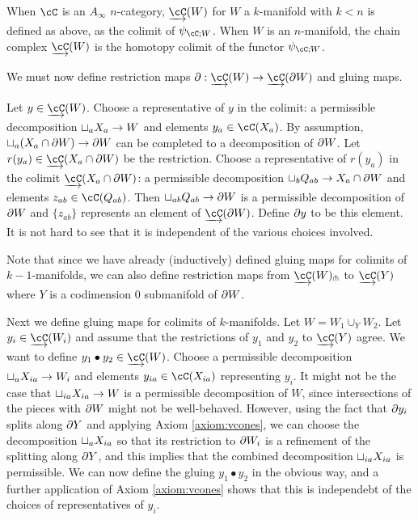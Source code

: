 \begin{defn}
When $\cC$ is an $A_\infty$ $n$-category, $\cl{\cC}(W)$ for $W$ a $k$-manifold with $k < n$ 
is defined as above, as the colimit of $\psi_{\cC;W}$.
When $W$ is an $n$-manifold, the chain complex $\cl{\cC}(W)$ is the homotopy colimit of the functor $\psi_{\cC;W}$.
\end{defn}


\medskip

We must now define restriction maps $\bd : \cl{\cC}(W) \to \cl{\cC}(\bd W)$ and gluing maps.

Let $y\in \cl{\cC}(W)$.
Choose a representative of $y$ in the colimit: a permissible decomposition $\sqcup_a X_a \to W$ and elements
$y_a \in \cC(X_a)$.
By assumption, $\sqcup_a (X_a \cap \partial W) \to \partial W$ can be completed to a decomposition of $\partial W$.
Let $r(y_a) \in \cl\cC(X_a \cap \bd W)$ be the restriction.
Choose a representative of $r(y_a)$ in the colimit $\cl\cC(X_a \cap \bd W)$: a permissible decomposition
$\sqcup_b Q_{ab} \to X_a \cap \partial W$ and elements $z_{ab} \in \cC(Q_{ab})$.
Then $\sqcup_{ab} Q_{ab} \to \partial W$ is a permissible decomposition of $\partial W$ and $\{z_{ab}\}$ represents
an element of $\cl{\cC}(\bd W)$.  Define $\partial y$ to be this element.
It is not hard to see that it is independent of the various choices involved.

Note that since we have already (inductively) defined gluing maps for colimits of $k{-}1$-manifolds,
we can also define restriction maps from $\cl{\cC}(W)\trans{}$ to $\cl{\cC}(Y)$ where $Y$ is a codimension 0 
submanifold of $\partial W$.

Next we define gluing maps for colimits of $k$-manifolds.
Let $W = W_1 \cup_Y W_2$.
Let $y_i \in \cl\cC(W_i)$ and assume that the restrictions of $y_1$ and $y_2$ to $\cl\cC(Y)$ agree.
We want to define $y_1\bullet y_2 \in \cl\cC(W)$.
Choose a permissible decomposition $\sqcup_a X_{ia} \to W_i$ and elements 
$y_{ia} \in \cC(X_{ia})$ representing $y_i$.
It might not be the case that $\sqcup_{ia} X_{ia} \to W$ is a permissible decomposition of $W$,
since intersections of the pieces with $\partial W$ might not be well-behaved.
However, using the fact that $\partial y_i$ splits along $\partial Y$ and applying Axiom \ref{axiom:vcones},
we can choose the decomposition $\sqcup_{a} X_{ia}$ so that its restriction to $\partial W_i$ is a refinement
of the splitting along $\partial Y$, and this implies that the combined decomposition $\sqcup_{ia} X_{ia}$
is permissible.
We can now define the gluing $y_1\bullet y_2$ in the obvious way, and a further application of Axiom \ref{axiom:vcones}
shows that this is independebt of the choices of representatives of $y_i$.


